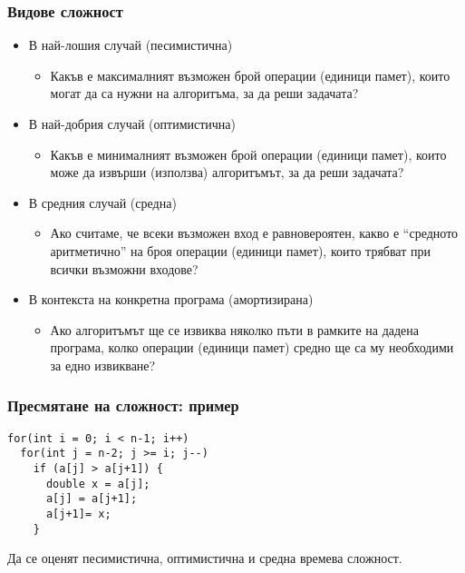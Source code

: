 \documentclass{beamer}
\begin{document}
\begin{frame}
  \frametitle{Видове сложност}

  \begin{itemize}[<+->]
  \item В най-лошия случай (песимистична)
    \begin{itemize}
    \item Какъв е максималният възможен брой операции (единици памет), които могат да са нужни на алгоритъма, за да реши задачата?
    \end{itemize}

  \item В най-добрия случай (оптимистична)
    \begin{itemize}
    \item Какъв е минималният възможен брой операции (единици памет), които може да извърши (използва) алгоритъмът, за да реши задачата?
    \end{itemize}

  \item В средния случай (средна)
    \begin{itemize}
    \item Ако считаме, че всеки възможен вход е равновероятен, какво е ``средното аритметично'' на броя операции (единици памет), които трябват при всички възможни входове?
    \end{itemize}

  \item В контекста на конкретна програма (амортизирана)
    \begin{itemize}
    \item Ако алгоритъмът ще се извиква няколко пъти в рамките на дадена програма, колко операции (единици памет) средно ще са му необходими за едно извикване?
    \end{itemize}
  \end{itemize}

\end{frame}

\begin{frame}[fragile]
  \frametitle{Пресмятане на сложност: пример}

\begin{verbatim}
for(int i = 0; i < n-1; i++)
  for(int j = n-2; j >= i; j--)
    if (a[j] > a[j+1]) {
      double x = a[j];
      a[j] = a[j+1];
      a[j+1]= x;
    }
\end{verbatim}

Да се оценят песимистична, оптимистична и средна времева сложност.
\end{frame}
\end{document}

